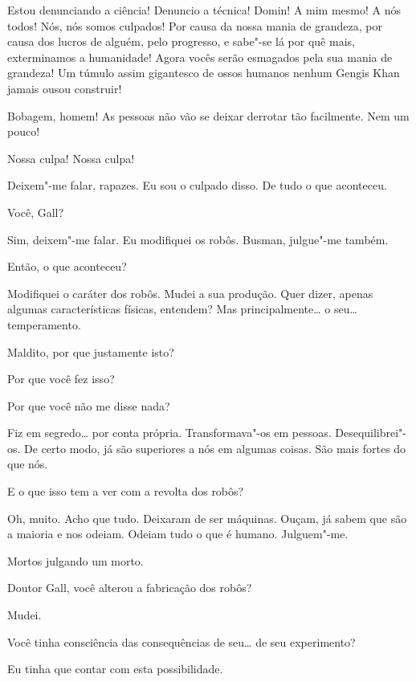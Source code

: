  Estou denunciando a ciência! Denuncio a técnica! Domin! A mim mesmo! A
nós todos! Nós, nós somos culpados! Por causa da nossa mania de grandeza, por
causa dos lucros de alguém, pelo progresso, e sabe"-se lá por quê mais, 
exterminamos a humanidade! Agora vocês serão esmagados pela sua mania de grandeza! Um
túmulo assim gigantesco de ossos humanos nenhum Gengis Khan jamais ousou construir!

 Bobagem, homem! As pessoas não vão se deixar derrotar tão
facilmente. Nem um pouco!

 Nossa culpa! Nossa culpa!

  Deixem"-me falar, rapazes. Eu sou o
culpado disso. De tudo o que aconteceu.

 Você, Gall?

 Sim, deixem"-me falar. Eu modifiquei os robôs. Busman, julgue"-me
também.

  Então, o que aconteceu?

 Modifiquei o caráter dos robôs. Mudei a sua produção. Quer dizer,
apenas algumas características físicas, entendem? Mas principalmente\ldots{} o seu\ldots{}
temperamento.

  Maldito, por que justamente isto?

 Por que você fez isso?

 Por que você não me disse nada?

 Fiz em segredo\ldots{} por conta própria. Transformava"-os em
pessoas. Desequilibrei"-os. De certo modo, já são superiores a nós em algumas coisas. São
mais fortes do que nós.

 E o que isso tem a ver com a revolta dos robôs?

 Oh, muito. Acho que tudo. Deixaram de ser máquinas. Ouçam, já sabem que
são a maioria e nos odeiam. Odeiam tudo o que é humano. Julguem"-me.

 Mortos julgando um morto.

 Doutor Gall, você alterou a fabricação dos robôs?

 Mudei.

 Você tinha consciência das consequências de seu\ldots{} de seu
experimento?

 Eu tinha que contar com esta possibilidade.


